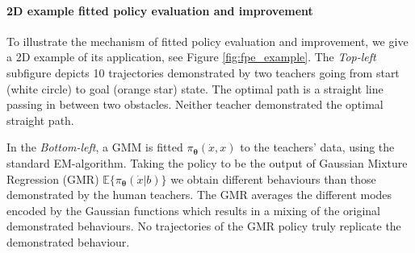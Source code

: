 \documentclass[final,3p,times,twocolumn]{elsarticle}
\newcommand{\X}{x}
\newcommand{\B}{b}
\newcommand{\U}{\dot{x}}
\newcommand{\Param}{\boldsymbol{\theta}}
\begin{document}


\paragraph{2D example fitted policy evaluation and improvement}

To illustrate the mechanism of fitted policy evaluation and improvement, we give a 2D example 
of its application, see Figure \ref{fig:fpe_example}. The \textit{Top-left} subfigure
depicts 10 trajectories demonstrated by two teachers going from start (white circle) to goal (orange star) state. 
The optimal path is a straight line passing in between two obstacles. 
Neither teacher demonstrated the optimal straight path. 

In the \textit{Bottom-left}, a GMM is fitted $\pi_{\Param}(\U,\X)$ to the teachers' data, using the standard EM-algorithm.
Taking the policy to be the output of Gaussian Mixture Regression (GMR) $\mathbb{E}\{\pi_{\Param}(\U|\B)\}$ we obtain different
behaviours than those demonstrated by the human teachers. The GMR averages the different modes encoded by the Gaussian functions 
which results in a mixing of the original demonstrated behaviours. No trajectories of the GMR policy truly replicate 
the demonstrated behaviour. 
\end{document}
